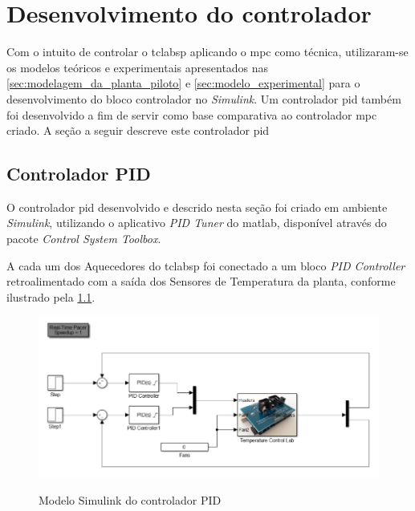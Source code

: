 \chapter{Desenvolvimento do controlador}
\label{ch:desenvolvimento_controlador}

Com o intuito de controlar o \acrshort{tclabsp} aplicando o \acrshort{mpc} como técnica,
utilizaram-se os modelos teóricos e experimentais apresentados nas \cref{sec:modelagem_da_planta_piloto}
e \cref{sec:modelo_experimental} para o desenvolvimento do bloco controlador no \textit{Simulink}.
Um controlador \acrshort{pid} também foi desenvolvido a fim de servir como base comparativa ao
controlador \acrshort{mpc} criado.
A seção a seguir descreve este controlador \acrshort{pid}

\section{Controlador PID}
\label{sec:controlador_pid}

O controlador \acrshort{pid} desenvolvido e descrido nesta seção foi criado em ambiente \textit{Simulink},
utilizando o aplicativo \textit{PID Tuner} do \acrshort{matlab}, disponível através do pacote
\textit{Control System Toolbox}.

A cada um dos Aquecedores do \acrshort{tclabsp} foi conectado a um bloco \textit{PID Controller} retroalimentado
com a saída dos Sensores de Temperatura da planta, conforme ilustrado pela \cref{fig:pidcreation}.

\begin{figure}[h]
	\caption{Modelo Simulink do controlador PID}
	\begin{center}
		\includegraphics[width=1.00\textwidth]{./5_images/PIDCreation.png} 
		\label{fig:pidcreation}
	\end{center}
	\centering
\end{figure}

